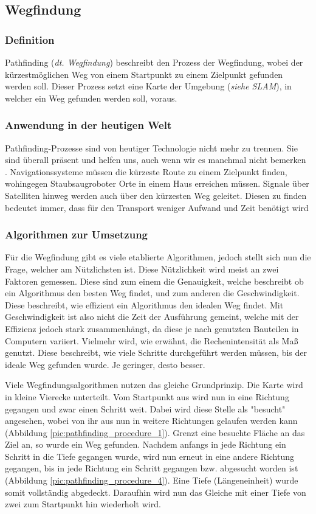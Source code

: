 {{	\subsection{Wegfindung}
	{
		\subsubsection{Definition}
		{
			Pathfinding (\textit{dt. Wegfindung}) beschreibt den Prozess der Wegfindung, wobei der kürzestmöglichen Weg von einem Startpunkt zu einem Zielpunkt gefunden werden soll. Dieser Prozess setzt eine Karte der Umgebung (\textit{siehe SLAM}), in welcher ein Weg gefunden werden soll, voraus.
		}
		
		\subsubsection{Anwendung in der heutigen Welt}
		{
			Pathfinding-Prozesse sind von heutiger Technologie nicht mehr zu trennen. Sie sind überall präsent und helfen uns, auch wenn wir es manchmal nicht bemerken . Navigationssysteme müssen die kürzeste Route zu einem Zielpunkt finden, wohingegen Staubsaugroboter Orte in einem Haus erreichen müssen. Signale über Satelliten hinweg werden auch über den kürzesten Weg geleitet. Diesen zu finden bedeutet immer, dass für den Transport weniger Aufwand und Zeit benötigt wird
		}
		
		\subsubsection{Algorithmen zur Umsetzung}
		{
			Für die Wegfindung gibt es viele etablierte Algorithmen, jedoch stellt sich nun die Frage, welcher am Nützlichsten ist. Diese Nützlichkeit wird meist an zwei Faktoren gemessen. Diese sind zum einem die Genauigkeit, welche beschreibt ob ein Algorithmus den besten Weg findet, und zum anderen die Geschwindigkeit. Diese beschreibt, wie effizient ein Algorithmus den idealen Weg findet. Mit Geschwindigkeit ist also nicht die Zeit der Ausführung gemeint, welche mit der Effizienz jedoch stark zusammenhängt, da diese je nach genutzten Bauteilen in Computern variiert. Vielmehr wird, wie erwähnt, die Rechenintensität als Maß genutzt. Diese beschreibt, wie viele Schritte durchgeführt werden müssen, bis der ideale Weg gefunden wurde. Je geringer, desto besser. 
			
			Viele Wegfindungsalgorithmen nutzen das gleiche Grundprinzip. Die Karte wird in kleine Vierecke unterteilt. Vom Startpunkt aus wird nun in eine Richtung gegangen und zwar einen Schritt weit. Dabei wird diese Stelle als "besucht" angesehen, wobei von ihr aus nun in weitere Richtungen gelaufen werden kann (Abbildung \ref{pic:pathfinding_procedure_1}). Grenzt eine besuchte Fläche an das Ziel an, so wurde ein Weg gefunden. Nachdem anfangs in jede Richtung ein Schritt in die Tiefe gegangen wurde, wird nun erneut in eine andere Richtung gegangen, bis in jede Richtung ein Schritt gegangen bzw. abgesucht worden ist (Abbildung \ref{pic:pathfinding_procedure_4}). Eine Tiefe (Längeneinheit) wurde somit vollständig abgedeckt. Daraufhin wird nun das Gleiche mit einer Tiefe von zwei zum Startpunkt hin wiederholt wird.
			
}}}}
